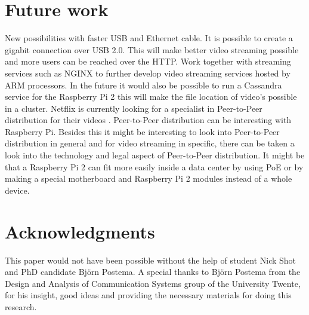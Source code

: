 \documentclass{sig-alternate-br}
\begin{document}
\section{Future work}
New possibilities with faster USB and Ethernet cable. It is possible to create a gigabit connection over USB 2.0. This will make better video streaming possible and more users can be reached over the HTTP. Work together with streaming services such as NGINX to further develop video streaming services hosted by ARM processors. In the future it would also be possible to run a Cassandra service for the Raspberry Pi 2 this will make the file location of video's possible in a cluster. Netflix is currently looking for a specialist in  Peer-to-Peer distribution for their videos \cite{netflix}.  Peer-to-Peer distribution can be interesting with Raspberry Pi. Besides this it might be interesting to look into Peer-to-Peer distribution in general and for video streaming in specific, there can be taken a look into the technology and legal aspect of  Peer-to-Peer distribution. It might be that a Raspberry Pi 2 can fit more easily inside a data center by using PoE or by making a special motherboard and Raspberry Pi 2 modules instead of a whole device. 

\section{Acknowledgments}
This paper would not have been possible without the help of  student Nick Shot and PhD candidate Björn Postema. A special thanks to Björn Postema from the Design and Analysis of Communication Systems group of the University Twente, for his insight, good ideas and providing the necessary materials
for doing this research.


%
%
\vspace{50 mm}


\clearpage
\appendix
\end{document}
